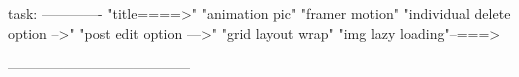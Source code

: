 task:
-------------
"title====>"
"animation pic"
"framer motion"
"individual delete option -->"
"post edit option --->"
"grid layout wrap"
"img lazy loading"--===>

---------------------------------------

